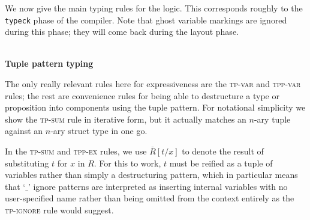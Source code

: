 \documentclass[acmsmall,nonacm]{acmart}
\DeclareMathOperator*{\Sep}{\scalerel*{\ast}{\sum}}
\newcommand{\proves}{\vdash}
\newcommand{\judgment}[2][]{\noindent\\\textbf{#1}\hspace{\stretch{1}}\fbox{$#2$}\nopagebreak}
\newcommand*{\axiom}[2][]{\infer[#1]{}{#2}}
\begin{document}
We now give the main typing rules for the logic. This corresponds roughly to the \texttt{typeck} phase of the compiler. Note that ghost variable markings are ignored during this phase; they will come back during the layout phase.

\judgment[Tuple pattern typing]{\Gamma \proves t:\tau \Rightarrow \overline{R}}

The only really relevant rules here for expressiveness are the \textsc{tp-var} and \textsc{tpp-var} rules; the rest are convenience rules for being able to destructure a type or proposition into components using the tuple pattern. For notational simplicity we show the \textsc{tp-sum} rule in iterative form, but it actually matches an $n$-ary tuple against an $n$-ary struct type in one go.

In the \textsc{tp-sum} and \textsc{tpp-ex} rules, we use $\overline{R}[t/x]$ to denote the result of substituting $t$ for $x$ in $R$. For this to work, $t$ must be reified as a tuple of variables rather than simply a destructuring pattern, which in particular means that `$\_$' ignore patterns are interpreted as inserting internal variables with no user-specified name rather than being omitted from the context entirely as the \textsc{tp-ignore} rule would suggest.
\end{document}
